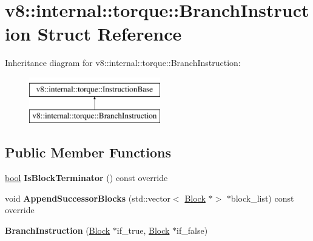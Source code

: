 \hypertarget{structv8_1_1internal_1_1torque_1_1BranchInstruction}{}\section{v8\+:\+:internal\+:\+:torque\+:\+:Branch\+Instruction Struct Reference}
\label{structv8_1_1internal_1_1torque_1_1BranchInstruction}
Inheritance diagram for v8\+:\+:internal\+:\+:torque\+:\+:Branch\+Instruction\+:\begin{figure}[H]
\begin{center}
\leavevmode
\includegraphics[height=2.000000cm]{structv8_1_1internal_1_1torque_1_1BranchInstruction}
\end{center}
\end{figure}
\subsection*{Public Member Functions}
\begin{DoxyCompactItemize}
\item 
\mbox{\label{structv8_1_1internal_1_1torque_1_1BranchInstruction_af5aa7e759a811e31efa4c27036bf67a2}} 
\mbox{\hyperlink{classbool}{bool}} {\bfseries Is\+Block\+Terminator} () const override
\item 
\mbox{\label{structv8_1_1internal_1_1torque_1_1BranchInstruction_ad7238b2234fd6634d125b95c88fa6745}} 
void {\bfseries Append\+Successor\+Blocks} (std\+::vector$<$ \mbox{\hyperlink{classv8_1_1internal_1_1torque_1_1Block}{Block}} $\ast$$>$ $\ast$block\+\_\+list) const override
\item 
\mbox{\label{structv8_1_1internal_1_1torque_1_1BranchInstruction_a553379b0dae1a26cb1b00e59ec33e695}} 
{\bfseries Branch\+Instruction} (\mbox{\hyperlink{classv8_1_1internal_1_1torque_1_1Block}{Block}} $\ast$if\+\_\+true, \mbox{\hyperlink{classv8_1_1internal_1_1torque_1_1Block}{Block}} $\ast$if\+\_\+false)
\end{DoxyCompactItemize}

